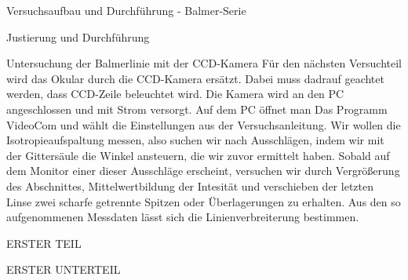 \documentclass[pdftex, a4paper,11pt, twoside, ngerman]{report}
\begin{document}
\begin{chapter}{Versuchsaufbau und Durchführung - Balmer-Serie}
\begin{section}{Justierung und Durchführung}
\begin{subsection}{Untersuchung der Balmerlinie mit der CCD-Kamera}
        Für den nächsten Versuchteil wird das Okular durch die CCD-Kamera ersätzt. Dabei muss dadrauf geachtet werden, dass CCD-Zeile beleuchtet wird. Die Kamera wird an den PC angeschlossen und mit Strom versorgt. Auf dem PC öffnet man Das Programm VideoCom und wählt die Einstellungen aus der Versuchsanleitung. Wir wollen die Isotropieaufspaltung messen, also suchen wir nach Ausschlägen, indem wir mit der Gittersäule die Winkel ansteuern, die wir zuvor ermittelt haben. Sobald auf dem Monitor einer dieser Ausschläge erscheint, versuchen wir durch Vergrößerung des Abschnittes, Mittelwertbildung der Intesität und verschieben der letzten Linse zwei scharfe getrennte Spitzen oder Überlagerungen zu erhalten. Aus den so aufgenommenen Messdaten lässt sich die Linienverbreiterung bestimmen.


      \end{subsection}

    \end{section}

  \end{chapter}
  
  
  \begin{appendix}
    \label{Anhang}
    
    
    
    \begin{chapter}{ERSTER TEIL}
      \label{Anhang:chp:ERSTERTEIL}
      
      
      
      \begin{section}{ERSTER UNTERTEIL}
        \label{Anhang:chp:ERSTERTEIL:sec:UNTERTEIL}
       
       
       
      \end{section}
      
      
    \end{chapter}
    
  \end{appendix}
  
\end{document}
